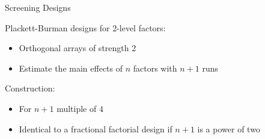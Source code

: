 \documentclass[10pt, compress, aspectratio=169, xcolor={table,usenames,dvipsnames}]{beamer}
\begin{document}
\begin{frame}
\begin{columns}[c]
            \begin{block}{Screening Designs}

                \vspace{.2cm}

                \alert{Plackett-Burman} designs for \alert{2-level factors}:

                \begin{itemize}
                    \item \alert{Orthogonal arrays} of \alert{strength 2}
                    \item Estimate the \alert{main effects} of \alert{$n$
                        factors with $n + 1$ runs}
                \end{itemize}

                Construction:

                \begin{itemize}
                    \item For \alert{$n + 1$ multiple of $4$}
                    \item Identical to a fractional factorial design if
                        \alert{$n + 1$ is a power of two}
                \end{itemize}
            \end{block}

    \end{columns}
\end{frame}
\end{document}
